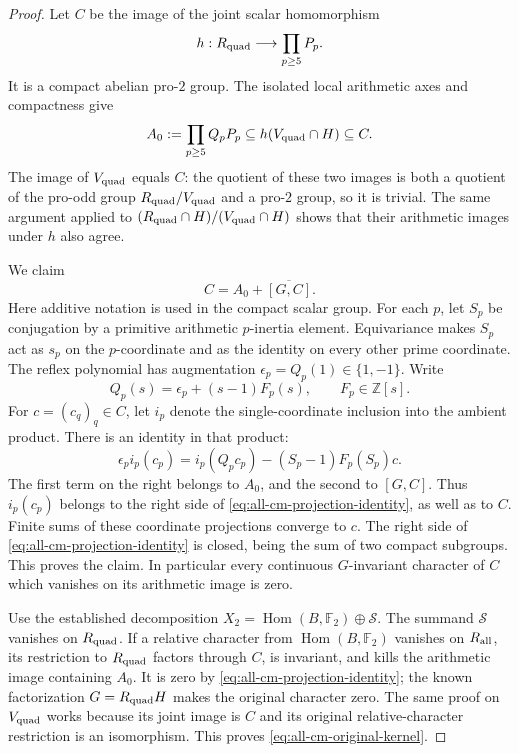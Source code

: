 \begin{proof}
Let \(C\) be the image of the joint scalar homomorphism
\[
 h:R_{\rm quad}\longrightarrow\prod_{p\geq5}P_p.
\]
It is a compact abelian pro-\(2\) group.
The isolated local arithmetic axes and compactness give
\begin{equation}
 A_0:=\prod_{p\geq5}Q_pP_p
                   \subseteq h(V_{\rm quad}\cap H)\subseteq C.
 \label{eq:all-cm-arithmetic-axes}
\end{equation}
The image of \(V_{\rm quad}\) equals \(C\): the quotient
of these two images is both a quotient of the pro-odd
group \(R_{\rm quad}/V_{\rm quad}\) and a pro-\(2\)
group, so it is trivial.
The same argument applied to
\((R_{\rm quad}\cap H)/(V_{\rm quad}\cap H)\)
shows that their arithmetic images under \(h\) also agree.

We claim
\begin{equation}
 C=A_0+\overline{[G,C]}.
 \label{eq:all-cm-projection-identity}
\end{equation}
Here additive notation is used in the compact scalar group.
For each \(p\), let \(S_p\) be conjugation by a primitive
arithmetic \(p\)-inertia element. Equivariance makes
\(S_p\) act as \(s_p\) on the \(p\)-coordinate and as
the identity on every other prime coordinate.
The reflex polynomial has augmentation
\(\epsilon_p=Q_p(1)\in\{1,-1\}\).
Write
\[
 Q_p(s)=\epsilon_p+(s-1)F_p(s),\qquad F_p\in\mathbb Z[s].
\]
For \(c=(c_q)_q\in C\), let \(i_p\) denote the
single-coordinate inclusion into the ambient product.
There is an identity in that product:
\begin{equation}
 \epsilon_p i_p(c_p)
   =i_p(Q_pc_p)-(S_p-1)F_p(S_p)c.
 \label{eq:all-cm-coordinate-projection}
\end{equation}
The first term on the right belongs to \(A_0\),
and the second to \([G,C]\).
Thus \(i_p(c_p)\) belongs to the right side of
\eqref{eq:all-cm-projection-identity}, as well as to \(C\).
Finite sums of these coordinate projections converge
to \(c\). The right side of
\eqref{eq:all-cm-projection-identity} is closed, being
the sum of two compact subgroups. This proves the claim.
In particular every continuous \(G\)-invariant
character of \(C\) which vanishes on its arithmetic
image is zero.

Use the established decomposition
\(X_2=\operatorname{Hom}(B,\mathbb F_2)\oplus\mathcal S\).
The summand \(\mathcal S\) vanishes on \(R_{\rm quad}\).
If a relative character from \(\operatorname{Hom}(B,\mathbb F_2)\)
vanishes on \(R_{\rm all}\), its restriction to
\(R_{\rm quad}\) factors through \(C\), is invariant,
and kills the arithmetic image containing \(A_0\).
It is zero by \eqref{eq:all-cm-projection-identity};
the known factorization \(G=R_{\rm quad}H\) makes the
original character zero. The same proof on \(V_{\rm quad}\)
works because its joint image is \(C\) and its original
relative-character restriction is an isomorphism.
This proves \eqref{eq:all-cm-original-kernel}.


\end{proof}

